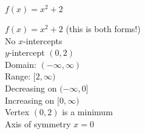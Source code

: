 {$f(x) = x^{2} + 2$}
{$f(x) = x^{2} + 2$ (this is both forms!) \\
No $x$-intercepts \\
$y$-intercept $(0, 2)$\\
Domain: $(-\infty, \infty)$ \\
Range: $[2, \infty)$ \\
Decreasing on $(-\infty, 0]$ \\
Increasing on $[0, \infty)$ \\
Vertex $(0, 2)$ is a minimum \\
Axis of symmetry $x = 0$ 

\begin{center}
\end{center}
}